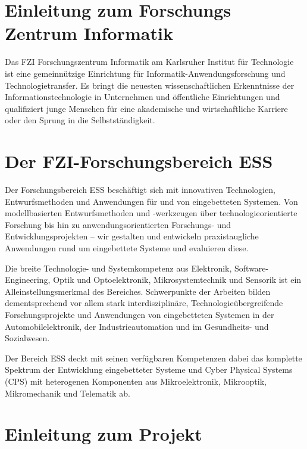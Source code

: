 
\section{Einleitung zum Forschungs Zentrum Informatik}
\label{sec:FZI}
\glqq Das FZI Forschungszentrum Informatik am Karlsruher Institut für Technologie ist eine gemeinnützige Einrichtung für Informatik-Anwendungsforschung und Technologietransfer. Es bringt die neuesten wissenschaftlichen Erkenntnisse der Informationstechnologie in Unternehmen und öffentliche Einrichtungen und qualifiziert junge Menschen für eine akademische und wirtschaftliche Karriere oder den Sprung in die Selbstständigkeit.\grqq{} \cite{FZI_info}

\section{Der FZI-Forschungsbereich ESS}
\label{sec:ESS}
\glqq Der Forschungsbereich \acf{ESS} beschäftigt sich mit innovativen Technologien, Entwurfsmethoden und Anwendungen für und von eingebetteten Systemen. Von modellbasierten Entwurfsmethoden und -werkzeugen über technologieorientierte Forschung bis hin zu anwendungsorientierten Forschungs- und Entwicklungsprojekten – wir gestalten und entwickeln praxistaugliche Anwendungen rund um eingebettete Systeme und evaluieren diese.

Die breite Technologie- und Systemkompetenz aus Elektronik, Software-Engineering, Optik und Optoelektronik, Mikrosystemtechnik und Sensorik ist ein Alleinstellungsmerkmal des Bereiches. Schwerpunkte der Arbeiten bilden dementsprechend vor allem stark interdisziplinäre, Technologieübergreifende Forschungsprojekte und Anwendungen von eingebetteten Systemen in der Automobilelektronik, der Industrieautomation und im Gesundheits- und Sozialwesen.

Der Bereich ESS deckt mit seinen verfügbaren Kompetenzen dabei das komplette Spektrum der Entwicklung eingebetteter Systeme und Cyber Physical Systems (CPS) mit heterogenen Komponenten aus Mikroelektronik, Mikrooptik, Mikromechanik und Telematik ab.\grqq{}  \cite{ESS}




\newpage
\section{Einleitung zum Projekt}
\label{sec:Porjekt}

